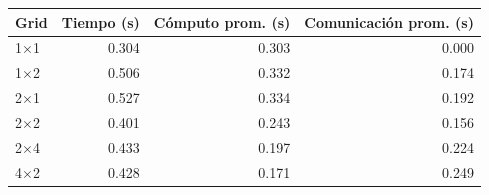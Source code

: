 \begin{tabular}{lrrr}
\toprule
Grid & Tiempo (s) & Cómputo prom. (s) & Comunicación prom. (s) \\
\midrule
1$\times$1 & 0.304 & 0.303 & 0.000 \\
1$\times$2 & 0.506 & 0.332 & 0.174 \\
2$\times$1 & 0.527 & 0.334 & 0.192 \\
2$\times$2 & 0.401 & 0.243 & 0.156 \\
2$\times$4 & 0.433 & 0.197 & 0.224 \\
4$\times$2 & 0.428 & 0.171 & 0.249 \\
\bottomrule
\end{tabular}
